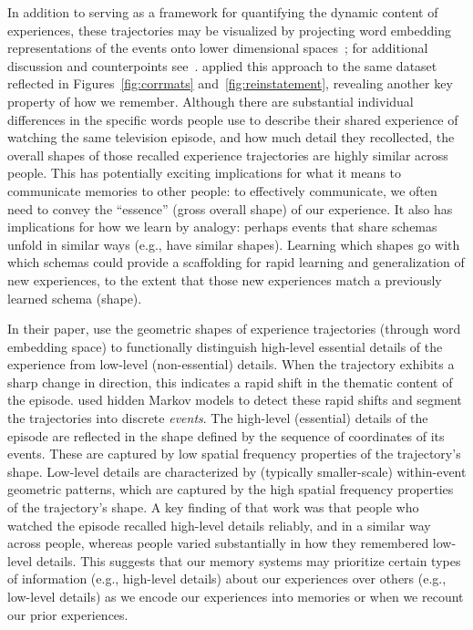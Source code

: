 \documentclass{article}
\begin{document}
In addition to serving as a framework for quantifying the dynamic content of experiences, these trajectories may be visualized by projecting word embedding representations of the events onto lower dimensional spaces~\citep[e.g., ][]{HeusEtal18a}; for additional discussion and counterpoints see~\cite{JollChan18}.  \cite{HeusEtal18c} applied this approach to the same dataset reflected in Figures~\ref{fig:corrmats} and~\ref{fig:reinstatement}, revealing another key property of how we remember.  Although there are substantial individual differences in the specific words people use to describe their shared experience of watching the same television episode, and how much detail they recollected, the overall shapes of those recalled experience trajectories are highly similar across people.  This has potentially exciting implications for what it means to communicate memories to other people: to effectively communicate, we often need to convey the ``essence'' (gross overall shape) of our experience.  It also has implications for how we learn by analogy: perhaps events that share schemas~\citep[e.g., ][]{BaldEtal18}  unfold in similar ways (e.g., have similar shapes).  Learning which shapes go with which schemas could provide a scaffolding for rapid learning and generalization of new experiences, to the extent that those new experiences match a previously learned schema (shape).

In their paper, \cite{HeusEtal18c} use the geometric shapes of experience trajectories (through word embedding space) to functionally distinguish high-level essential details of the experience from low-level (non-essential) details.  When the trajectory exhibits a sharp change in direction, this indicates a rapid shift in the thematic content of the episode.  \cite{HeusEtal18c} used hidden Markov models to detect these rapid shifts and segment the trajectories into discrete \textit{events}.  The high-level (essential) details of the episode are reflected in the shape defined by the sequence of coordinates of its events.  These are captured by low spatial frequency properties of the trajectory's shape.  Low-level details are characterized by (typically smaller-scale) within-event geometric patterns, which are captured by the high spatial frequency properties of the trajectory's shape.  A key finding of that work was that people who watched the episode recalled high-level details reliably, and in a similar way across people, whereas people varied substantially in how they remembered low-level details.  This suggests that our memory systems may prioritize certain types of information (e.g., high-level details) about our experiences over others (e.g., low-level details) as we encode our experiences into memories or when we recount our prior experiences.
\end{document}

